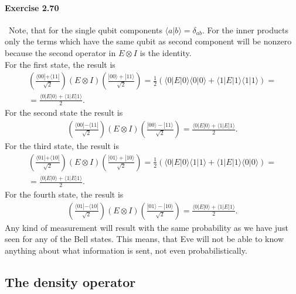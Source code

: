 \documentclass[a4paper,12pt]{article}
\newcommand{\exercise}[1]{\paragraph{Exercise #1}}
\newcommand{\la}{\langle}
\newcommand{\ra}{\rangle}
\begin{document}
    \exercise{2.70} \ Note, that for the single qubit components $\la a | b \ra = \delta_{ab}$. For the inner products only the terms which have the same qubit as second component will be nonzero because the second operator in $E\otimes I$ is the identity.\\
    For the first state, the result is
    \begin{gather}
        \nonumber
        \left( \frac{\la 00| + \la 11|}{\sqrt{2}} \right)
        (E \otimes I)
        \left( \frac{| 00 \ra + | 11 \ra}{\sqrt{2}} \right) =
        \frac{1}{2}( \la 0 | E | 0 \ra \la 0 | 0 \ra + \la 1 | E | 1 \ra \la 1 | 1 \ra) = \\
        = \frac{\la 0 | E | 0 \ra + \la 1 | E | 1 \ra}{2} \textrm{.}
    \end{gather}
    For the second state the result is
    \begin{gather}
        \left( \frac{\la 00| - \la 11|}{\sqrt{2}} \right)
        (E \otimes I)
        \left( \frac{| 00 \ra - | 11 \ra}{\sqrt{2}} \right) =
        \frac{\la 0 | E | 0 \ra + \la 1 | E | 1 \ra}{2} \textrm{.}
    \end{gather}
    For the third state, the result is
    \begin{gather}
        \nonumber
        \left( \frac{\la 01| + \la 10|}{\sqrt{2}} \right)
        (E \otimes I)
        \left( \frac{| 01 \ra + | 10 \ra}{\sqrt{2}} \right) =
        \frac{1}{2}( \la 0 | E | 0 \ra \la 1 | 1 \ra + \la 1 | E | 1 \ra \la 0 | 0 \ra) = \\
        \nonumber
        = \frac{\la 0 | E | 0 \ra + \la 1 | E | 1 \ra}{2} \textrm{.}
    \end{gather}
    For the fourth state, the result is
    \begin{gather}
        \left( \frac{\la 01| - \la 10|}{\sqrt{2}} \right)
        (E \otimes I)
        \left( \frac{| 01 \ra - | 10 \ra}{\sqrt{2}} \right) =
        \frac{\la 0 | E | 0 \ra + \la 1 | E | 1 \ra}{2} \textrm{.}
    \end{gather}
    \indent
    Any kind of measurement will result with the same probability as we have just seen for any of the Bell states. This means, that Eve will not be able to know anything about what information is sent, not even probabilistically.

    \subsection{The density operator}
\end{document}

